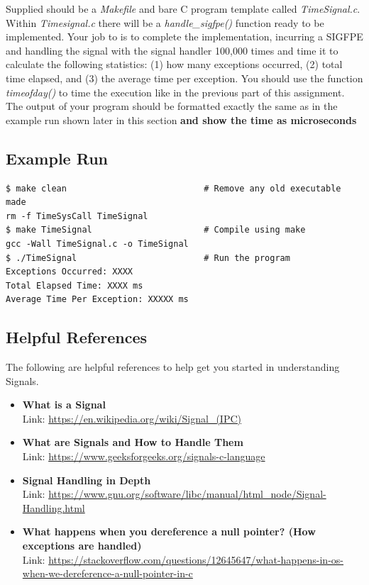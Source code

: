 \documentclass{article}
\begin{document}
Supplied should be a \textit{Makefile} and bare C program template called \textit{TimeSignal.c}. Within \textit{Timesignal.c} there will be a \textit{handle\_sigfpe()} function ready to be implemented. Your job to is to complete the implementation, incurring a SIGFPE and handling the signal with the signal handler 100,000 times and time it to calculate the following statistics: (1) how many exceptions occurred, (2) total time elapsed, and (3) the average time per exception. You should use the function \textit{timeofday()} to time the execution like in the previous part of this assignment. The output of your program should be formatted exactly the same as in the example run shown later in this section \textbf{and show the time as microseconds}\\


\subsection*{Example Run}
\begin{commandline}
\begin{verbatim}
$ make clean                           # Remove any old executable made
rm -f TimeSysCall TimeSignal
$ make TimeSignal                      # Compile using make
gcc -Wall TimeSignal.c -o TimeSignal
$ ./TimeSignal                         # Run the program
Exceptions Occurred: XXXX
Total Elapsed Time: XXXX ms
Average Time Per Exception: XXXXX ms
\end{verbatim}
\end{commandline}


\subsection*{Helpful References}
The following are helpful references to help get you started in understanding Signals.
\begin{itemize}
\item \textbf{What is a Signal} \\
Link:  \href{https://en.wikipedia.org/wiki/Signal_(IPC)}{https://en.wikipedia.org/wiki/Signal\_(IPC)}
\item \textbf{What are Signals and How to Handle Them}\\
Link:  \href{https://www.geeksforgeeks.org/signals-c-language}{https://www.geeksforgeeks.org/signals-c-language}
\item \textbf{Signal Handling in Depth}\\
Link:  \href{https://www.gnu.org/software/libc/manual/html_node/Signal-Handling.html}{https://www.gnu.org/software/libc/manual/html\_node/Signal-Handling.html}
\item \textbf{What happens when you dereference a null pointer? (How exceptions are handled)}\\
Link:  \href{https://stackoverflow.com/questions/12645647/what-happens-in-os-when-we-dereference-a-null-pointer-in-c}{https://stackoverflow.com/questions/12645647/what-happens-in-os-when-we-dereference-a-null-pointer-in-c}
\end{itemize}
\end{document}
